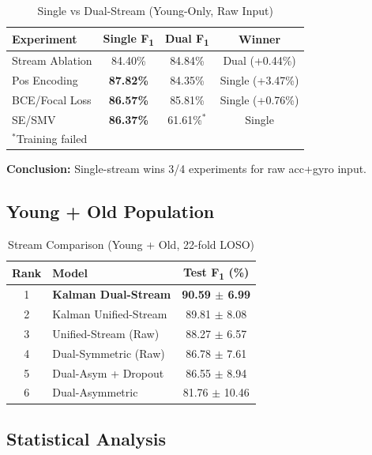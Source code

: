 \documentclass[journal,12pt]{IEEEtran}
\newcommand{\best}[1]{\textbf{\textcolor{bestresult}{#1}}}
\newcommand{\fone}{F\textsubscript{1}}
\begin{document}
\begin{table}[htbp]
\centering
\caption{Single vs Dual-Stream (Young-Only, Raw Input)}
\label{tab:stream_young}
\begin{tabular}{@{}lccc@{}}
\toprule
\textbf{Experiment} & \textbf{Single \fone{}} & \textbf{Dual \fone{}} & \textbf{Winner} \\
\midrule
Stream Ablation & 84.40\% & 84.84\% & Dual (+0.44\%) \\
Pos Encoding & \best{87.82\%} & 84.35\% & Single (+3.47\%) \\
BCE/Focal Loss & \best{86.57\%} & 85.81\% & Single (+0.76\%) \\
SE/SMV & \best{86.37\%} & 61.61\%$^*$ & Single \\
\bottomrule
\multicolumn{4}{l}{\footnotesize $^*$Training failed}
\end{tabular}
\end{table}

\textbf{Conclusion:} Single-stream wins 3/4 experiments for raw acc+gyro input.

\subsection{Young + Old Population}

\begin{table}[htbp]
\centering
\caption{Stream Comparison (Young + Old, 22-fold LOSO)}
\label{tab:stream_mixed}
\begin{tabular}{@{}clc@{}}
\toprule
\textbf{Rank} & \textbf{Model} & \textbf{Test \fone{} (\%)} \\
\midrule
1 & \best{Kalman Dual-Stream} & \best{90.59 $\pm$ 6.99} \\
2 & Kalman Unified-Stream & 89.81 $\pm$ 8.08 \\
3 & Unified-Stream (Raw) & 88.27 $\pm$ 6.57 \\
4 & Dual-Symmetric (Raw) & 86.78 $\pm$ 7.61 \\
5 & Dual-Asym + Dropout & 86.55 $\pm$ 8.94 \\
6 & Dual-Asymmetric & 81.76 $\pm$ 10.46 \\
\bottomrule
\end{tabular}
\end{table}

\subsection{Statistical Analysis}
\end{document}
